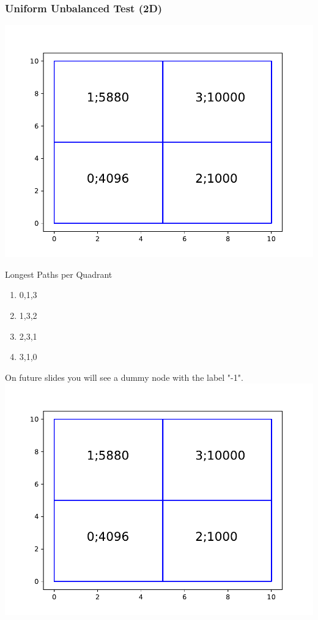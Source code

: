 \documentclass[xcolor={usenames,dvipsnames,svgnames,table}]{beamer}
\begin{document}
\begin{frame}[t]\frametitle{Uniform Unbalanced Test (2D)}
\centering
\includegraphics[trim={1cm 0cm 1cm 1cm},clip,scale=0.75]{figures/2d_layer.pdf}
\end{frame}

\begin{frame}[t]{Longest Paths per Quadrant}
\begin{block}{}
	\begin{enumerate}
		\item 0,1,3
		\item 1,3,2
		\item 2,3,1
		\item 3,1,0
	\end{enumerate}
\end{block}
On future slides you will see a dummy node with the label "-1".
\includegraphics[trim={1cm 0cm 1cm 1cm},clip,scale=0.4]{figures/2d_layer.pdf}
\end{frame}
\end{document}
